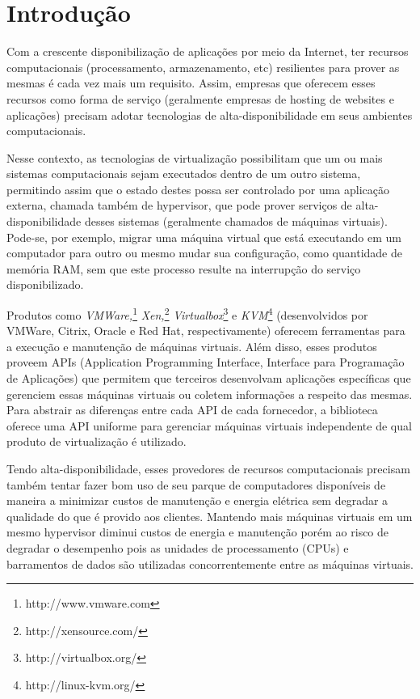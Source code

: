 %
%

\chapter{Introdução}

Com a crescente disponibilização de aplicações por meio da Internet, ter
recursos computacionais (processamento, armazenamento, etc) resilientes
para prover as mesmas é cada vez mais um requisito. Assim, empresas que
oferecem esses recursos como forma de serviço (geralmente empresas de
hosting de websites e aplicações) precisam adotar tecnologias de
alta-disponibilidade em seus ambientes computacionais.

Nesse contexto, as tecnologias de virtualização possibilitam que um ou mais
sistemas computacionais sejam executados dentro de um outro sistema,
permitindo assim que o estado destes possa ser controlado por uma aplicação
externa, chamada também de hypervisor, que pode prover serviços de
alta-disponibilidade desses sistemas (geralmente chamados de máquinas
virtuais). Pode-se, por exemplo, migrar uma máquina virtual que está
executando em um computador para outro ou mesmo mudar sua configuração,
como quantidade de memória RAM, sem que este processo resulte na
interrupção do serviço disponibilizado.

Produtos como \emph{VMWare,}\footnote{http://www.vmware.com}
\emph{Xen,}\footnote{http://xensource.com/}
\emph{Virtualbox}\footnote{http://virtualbox.org/} e
\emph{KVM}\footnote{http://linux-kvm.org/} (desenvolvidos por VMWare,
Citrix, Oracle e Red Hat, respectivamente) oferecem ferramentas para a
execução e manutenção de máquinas virtuais. Além disso, esses produtos
proveem APIs (Application Programming Interface, Interface para Programação
de Aplicações) que permitem que terceiros desenvolvam aplicações
específicas que gerenciem essas máquinas virtuais ou coletem informações a
respeito das mesmas. Para abstrair as diferenças entre cada API de cada
fornecedor, a biblioteca \libvirt{} oferece uma API uniforme para gerenciar
máquinas virtuais independente de qual produto de virtualização é
utilizado.

Tendo alta-disponibilidade, esses provedores de recursos computacionais
precisam também tentar fazer bom uso de seu parque de computadores
disponíveis de maneira a  minimizar custos de manutenção e energia elétrica
sem degradar a qualidade do que é provido aos clientes. Mantendo mais
máquinas virtuais em um mesmo hypervisor diminui custos de energia e
manutenção porém ao risco de degradar o desempenho pois as unidades de
processamento (CPUs) e barramentos de dados são utilizadas concorrentemente
entre as máquinas virtuais.

